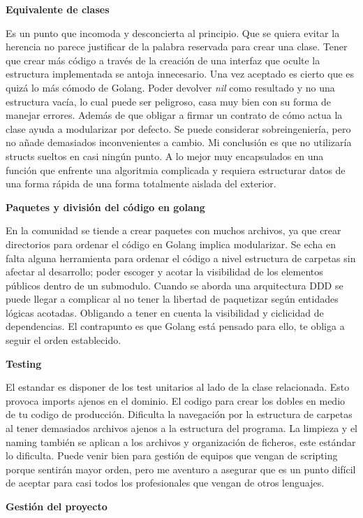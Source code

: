 \textbf{Equivalente de clases}

Es un punto que incomoda y desconcierta al principio. Que se quiera evitar la herencia no parece justificar de la palabra reservada para crear una clase. Tener que crear más código a través de la creación de una interfaz que oculte la estructura implementada se antoja innecesario. Una vez aceptado es cierto que es quizá lo más cómodo de Golang. Poder devolver \textit{nil} como resultado y no una estructura vacía, lo cual puede ser peligroso, casa muy bien con su forma de manejar errores. Además de que obligar a firmar un contrato de cómo actua la clase ayuda a modularizar por defecto. Se puede considerar sobreingeniería, pero no añade demasiados inconvenientes a cambio. Mi conclusión es que no utilizaría structs sueltos en casi ningún punto. A lo mejor muy encapsulados en una función que enfrente una algoritmia complicada y requiera estructurar datos de una forma rápida de una forma totalmente aislada del exterior.

\textbf{Paquetes y división del código en golang}

En la comunidad se tiende a crear paquetes con muchos archivos, ya que crear directorios para ordenar el código en Golang implica modularizar. Se echa en falta alguna herramienta para ordenar el código a nivel estructura de carpetas sin afectar al desarrollo; poder escoger y acotar la visibilidad de los elementos públicos dentro de un submodulo. Cuando se aborda una arquitectura DDD se puede llegar a complicar al no tener la libertad de paquetizar según entidades lógicas acotadas. Obligando a tener en cuenta la visibilidad y ciclicidad de dependencias. El contrapunto es que Golang está pensado para ello, te obliga a seguir el orden establecido.

\textbf{Testing}

El estandar es disponer de los test unitarios al lado de la clase relacionada. Esto provoca imports ajenos en el dominio. El codigo para crear los dobles en medio de tu codigo de producción. Dificulta la navegación por la estructura de carpetas al tener demasiados archivos ajenos a la estructura del programa. La limpieza y el naming también se aplican a los archivos y organización de ficheros, este estándar lo dificulta. Puede venir bien para gestión de equipos que vengan de scripting porque sentirán mayor orden, pero me aventuro a asegurar que es un punto difícil de aceptar para casi todos los profesionales que vengan de otros lenguajes.

\textbf{Gestión del proyecto}

